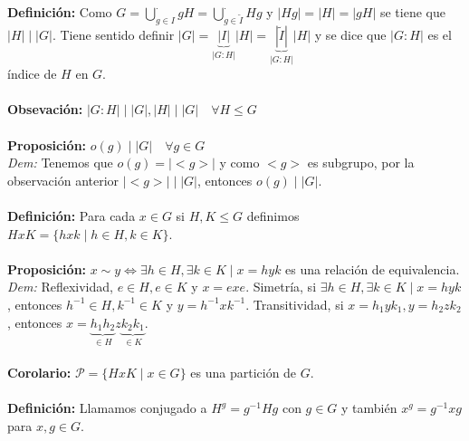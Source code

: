 \documentclass{article}
\begin{document}

\textbf{Definición:} Como $G=\displaystyle\bigcup_{g\in I}^\cdot gH=\displaystyle\bigcup_{g\in \tilde{I}}^\cdot Hg$ y $|Hg|=|H|=|gH|$ se tiene que $|H|\mid|G|$. Tiene sentido definir $|G|=\underbrace{|I|}_{|G:H|}|H|=\underbrace{|\tilde{I}|}_{|G:H|}|H|$ y se dice que $|G:H|$ es el índice de $H$ en $G$.\\\\


\textbf{Obsevación:} $|G:H|\mid|G|,|H|\mid|G|\quad\forall H\le G$\\\\


\textbf{Proposición:} $o(g)\mid|G|\quad\forall g\in G$\\
\textit{Dem:} Tenemos que $o(g)=|<g>|$ y como $<g>$ es subgrupo, por la observación anterior $|<g>|\mid|G|$, entonces $o(g)\mid|G|$.\\\\


\textbf{Definición:} Para cada $x\in G$ si $H,K\le G$ definimos $HxK=\{hxk\mid h\in H, k\in K\}$.\\\\


\textbf{Proposición:} $x\sim y \Leftrightarrow \exists h\in H, \exists k\in K \mid x=hyk$ es una relación de equivalencia.\\
\textit{Dem:} Reflexividad, $e\in H, e\in K$ y $x=exe$. Simetría, si $\exists h\in H, \exists k\in K \mid x=hyk$, entonces $h^{-1}\in H, k^{-1}\in K$ y $y=h^{-1}xk^{-1}$. Transitividad, si $x=h_1yk_1, y=h_2zk_2$, entonces $x=\underbrace{h_1h_2}_{\in H}z\underbrace{k_2k_1}_{\in K}$.\\\\


\textbf{Corolario:} $\mathcal{P}=\{HxK\mid x \in G\}$ es una partición de $G$.\\\\


\textbf{Definición:} Llamamos conjugado a $H^g=g^{-1}Hg$ con $g\in G$ y también $x^g=g^{-1}xg$ para $x,g\in G$.\\\\
\end{document}
